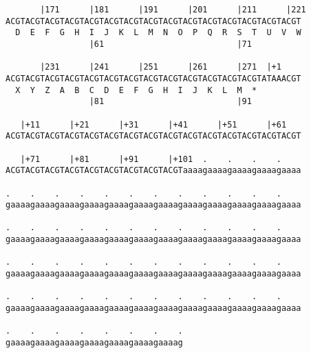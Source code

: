 \documentclass{article}
\begin{document}
\begin{Verbatim}
       |171      |181      |191      |201      |211      |221
ACGTACGTACGTACGTACGTACGTACGTACGTACGTACGTACGTACGTACGTACGTACGT
  D  E  F  G  H  I  J  K  L  M  N  O  P  Q  R  S  T  U  V  W
                 |61                           |71          
  
       |231      |241      |251      |261      |271  |+1    
ACGTACGTACGTACGTACGTACGTACGTACGTACGTACGTACGTACGTACGTATAAACGT
  X  Y  Z  A  B  C  D  E  F  G  H  I  J  K  L  M  *   
                 |81                           |91          
  
   |+11      |+21      |+31      |+41      |+51      |+61   
ACGTACGTACGTACGTACGTACGTACGTACGTACGTACGTACGTACGTACGTACGTACGT
                                                            
   |+71      |+81      |+91      |+101  .    .    .    .    
ACGTACGTACGTACGTACGTACGTACGTACGTACGTaaaagaaaagaaaagaaaagaaaa
                                                            
.    .    .    .    .    .    .    .    .    .    .    .    
gaaaagaaaagaaaagaaaagaaaagaaaagaaaagaaaagaaaagaaaagaaaagaaaa
                                                            
.    .    .    .    .    .    .    .    .    .    .    .    
gaaaagaaaagaaaagaaaagaaaagaaaagaaaagaaaagaaaagaaaagaaaagaaaa
                                                            
.    .    .    .    .    .    .    .    .    .    .    .    
gaaaagaaaagaaaagaaaagaaaagaaaagaaaagaaaagaaaagaaaagaaaagaaaa
                                                            
.    .    .    .    .    .    .    .    .    .    .    .    
gaaaagaaaagaaaagaaaagaaaagaaaagaaaagaaaagaaaagaaaagaaaagaaaa
                                                            
.    .    .    .    .    .    .    .
gaaaagaaaagaaaagaaaagaaaagaaaagaaaag
                                    
                                    
\end{Verbatim}
\end{document}
